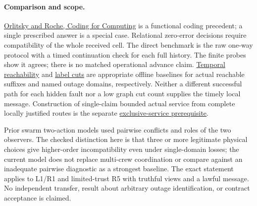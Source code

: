 \documentclass[11pt]{article}
\begin{document}
\paragraph{Comparison and scope.}
\href{https://doi.org/10.1109/18.915643}{Orlitsky and Roche, Coding for Computing} is a functional coding precedent; a single prescribed answer is a special case. Relational zero-error decisions require compatibility of the whole received cell. The direct benchmark is the raw one-way protocol with a timed continuation check for each full history. The finite probes show it agrees; there is no matched operational advance claim. \href{https://david-kempe.com/publications/time.pdf}{Temporal reachability} and \href{https://pages.cs.wisc.edu/~jyc/papers/label-cut.pdf}{label cuts} are appropriate offline baselines for actual reachable suffixes and named outage domains, respectively. Neither a different successful path for each hidden fault nor a low graph cut count supplies the timely local message. Construction of single-claim bounded actual service from complete locally justified routes is the separate \href{https://github.com/eternal-november/eos-research-programmes/blob/e396e54d31567ae10f7f61cfa6f33f9b63f5777e/projects/byzantine-control/exclusive-service/RULE.md}{exclusive-service prerequisite}.

Prior swarm two-action models used pairwise conflicts and roles of the two observers. The checked distinction here is that three or more legitimate physical choices give higher-order incompatibility even under single-domain losses; the current model does not replace multi-crew coordination or compare against an inadequate pairwise diagnostic as a strongest baseline. The exact statement applies to L1/R1 and limited-trust R5 with truthful views and a lawful message. No independent transfer, result about arbitrary outage identification, or contract acceptance is claimed.
\end{document}
